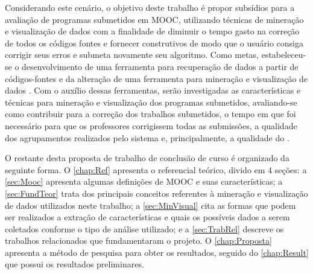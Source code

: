 %	
	
	Considerando este cenário, o objetivo deste trabalho é propor subsídios para a
	avaliação de programas submetidos em MOOC, utilizando técnicas de mineração e visualização
	de dados com a finalidade de diminuir o tempo gasto na correção de todos os códigos
	fontes e  fornecer  construtivos de modo que o usuário consiga
	corrigir seus erros e submeta novamente seu algoritmo. Como metas, estabeleceu-se
	o desenvolvimento de uma ferramenta para recuperação de dados a partir de
	códigos-fontes e da alteração de uma ferramenta para mineração e visualização de
	dados \cite{Alencar-etal:2012}. Com o auxílio dessas ferramentas, serão investigadas as
	características e técnicas para mineração e visualização dos programas submetidos,
	avaliando-se como contribuir para a correção dos trabalhos submetidos, o tempo em
	que foi necessário para que os professores corrigissem todas as submissões, a
	qualidade dos agrupamentos realizados pelo sistema e, principalmente, a
	qualidade do .
	
	O restante desta proposta de trabalho de conclusão de curso é organizado da seguinte
	forma. O \cref{chap:Ref} apresenta o referencial teórico, divido em 4 seções: a
	\cref{sec:Mooc} apresenta algumas definições de MOOC e suas características; a
	\cref{sec:FundTeor} trata dos principais conceitos referentes à mineração e
	visualização de dados utilizados neste trabalho; a \cref{sec:MinVisual} cita as
	formas que podem ser realizados a extração de características e quais os possíveis
	dados a serem coletados conforme o tipo de análise utilizado; e a \cref{sec:TrabRel}
	descreve os trabalhos relacionados que fundamentaram o projeto. O \cref{chap:Proposta}
	apresenta a método de pesquisa para obter os resultados, seguido do \cref{chap:Result}
	que possui os resultados preliminares.
